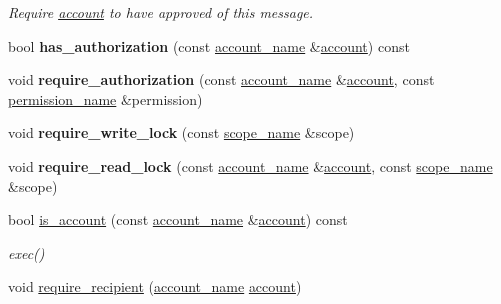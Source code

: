 \begin{DoxyCompactItemize}
\begin{DoxyCompactList}\small\item\em Require \mbox{\hyperlink{structaccount}{account}} to have approved of this message. \end{DoxyCompactList}\item 
\mbox{\label{classaacio_1_1chain_1_1apply__context_a45cc590347b946c7005739d191807ae2}} 
bool {\bfseries has\+\_\+authorization} (const \mbox{\hyperlink{structaacio_1_1chain_1_1name}{account\+\_\+name}} \&\mbox{\hyperlink{structaccount}{account}}) const
\item 
\mbox{\label{classaacio_1_1chain_1_1apply__context_a4ac537fa5ac577abb2760ab83157b74d}} 
void {\bfseries require\+\_\+authorization} (const \mbox{\hyperlink{structaacio_1_1chain_1_1name}{account\+\_\+name}} \&\mbox{\hyperlink{structaccount}{account}}, const \mbox{\hyperlink{structaacio_1_1chain_1_1name}{permission\+\_\+name}} \&permission)
\item 
\mbox{\label{classaacio_1_1chain_1_1apply__context_a323e3a339fa054e2c1b6e8bbdd296d45}} 
void {\bfseries require\+\_\+write\+\_\+lock} (const \mbox{\hyperlink{structaacio_1_1chain_1_1name}{scope\+\_\+name}} \&scope)
\item 
\mbox{\label{classaacio_1_1chain_1_1apply__context_a66de28738031657589fcc8f97927c033}} 
void {\bfseries require\+\_\+read\+\_\+lock} (const \mbox{\hyperlink{structaacio_1_1chain_1_1name}{account\+\_\+name}} \&\mbox{\hyperlink{structaccount}{account}}, const \mbox{\hyperlink{structaacio_1_1chain_1_1name}{scope\+\_\+name}} \&scope)
\item 
bool \mbox{\hyperlink{classaacio_1_1chain_1_1apply__context_a61355dcfe58eb46088a8bd07fe769025}{is\+\_\+account}} (const \mbox{\hyperlink{structaacio_1_1chain_1_1name}{account\+\_\+name}} \&\mbox{\hyperlink{structaccount}{account}}) const
\begin{DoxyCompactList}\small\item\em exec() \end{DoxyCompactList}\item 
void \mbox{\hyperlink{classaacio_1_1chain_1_1apply__context_a767dfd92447d09361a20944e34a0b66a}{require\+\_\+recipient}} (\mbox{\hyperlink{structaacio_1_1chain_1_1name}{account\+\_\+name}} \mbox{\hyperlink{structaccount}{account}})

\end{DoxyCompactItemize}
